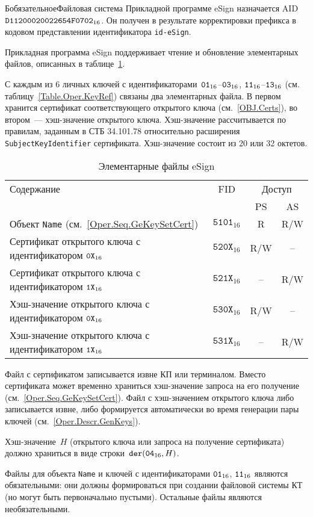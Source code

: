 \begin{appendix}{Б}{обязательное}{Файловая система}
Прикладной программе eSign назначается AID~$\texttt{D11200020022654F0702}_{16}$. 
Он получен в результате корректировки префикса в кодовом представлении 
идентификатора \verb|id-eSign|.

Прикладная программа eSign поддерживает чтение и обновление 
элементарных файлов, описанных в таблице~\ref{Table.FILES.EFSIGN}.

С каждым из 6 личных ключей с идентификаторами~$\texttt{01}_{16}$--$\texttt{03}_{16}$,
$\texttt{11}_{16}$--$\texttt{13}_{16}$ (см. таблицу~\ref{Table.Oper.KeyRef}) 
связаны два элементарных файла. 
В первом хранится сертификат соответствующего открытого ключа 
(см.~\ref{OBJ.Certs}), во втором~--- хэш-значение открытого ключа.
%
Хэш-значение рассчитывается по правилам, заданным в СТБ 34.101.78
относительно расширения \texttt{SubjectKeyIdentifier} сертификата.
Хэш-значение состоит из 20 или 32 октетов.

\begin{table}[H]
\caption{Элементарные файлы eSign}
\label{Table.FILES.EFSIGN}
\begin{tabular}{|l|c|c|c|}
\hline
Содержание & FID & \multicolumn{2}{|c|}{Доступ}\\
\cline{3-4}
&& PS & AS \\
\hline
\hline
Объект \texttt{Name} (см.~\ref{Oper.Seq.GeKeySetCert}) & 
$\texttt{5101}_{16}$ & R & R/W \\
Сертификат открытого ключа с идентификатором $\texttt{0X}_{16}$ & 
$\texttt{520X}_{16}$ & R/W & -- \\
Сертификат открытого ключа с идентификатором $\texttt{1X}_{16}$ & 
$\texttt{521X}_{16}$ & -- & R/W \\
Хэш-значение открытого ключа с идентификатором $\texttt{0X}_{16}$ & 
$\texttt{530X}_{16}$ & R/W & -- \\
Хэш-значение открытого ключа с идентификатором $\texttt{1X}_{16}$ & 
$\texttt{531X}_{16}$ & -- & R/W \\
\hline
\end{tabular}
\end{table}

Файл с сертификатом записывается извне КП или терминалом.
%
Вместо сертификата может временно храниться хэш-значение запроса 
на его получение (см.~\ref{Oper.Seq.GeKeySetCert}). 
%
Файл с хэш-значением открытого ключа либо записывается извне, либо формируется 
автоматически во время генерации пары ключей (см.~\ref{Oper.Descr.GenKeys}).

Хэш-значение~$H$ (открытого ключа или запроса на получение сертификата) должно 
храниться в виде строки~$\texttt{der}(\texttt{04}_{16}, H)$.

Файлы для объекта \texttt{Name} и ключей с идентификаторами $\texttt{01}_{16}$, $\texttt{11}_{16}$
являются обязательными: они должны формироваться при создании файловой 
системы КТ (но могут быть первоначально пустыми). 
Остальные файлы являются необязательными.
\end{appendix}